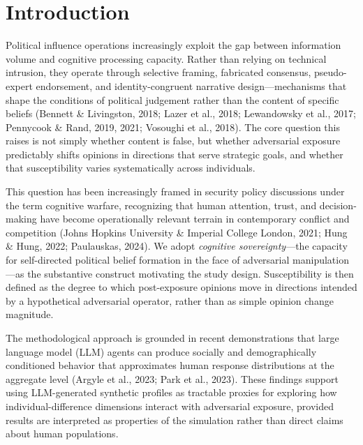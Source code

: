 \documentclass[11pt]{article}
\begin{document}
\section{Introduction}
Political influence operations increasingly exploit the gap between information volume and cognitive processing capacity.
Rather than relying on technical intrusion, they operate through selective framing, fabricated consensus, pseudo-expert endorsement, and identity-congruent narrative design---mechanisms that shape the conditions of political judgement rather than the content of specific beliefs (Bennett \& Livingston, 2018; Lazer et al., 2018; Lewandowsky et al., 2017; Pennycook \& Rand, 2019, 2021; Vosoughi et al., 2018).
The core question this raises is not simply whether content is false, but whether adversarial exposure predictably shifts opinions in directions that serve strategic goals, and whether that susceptibility varies systematically across individuals.

This question has been increasingly framed in security policy discussions under the term cognitive warfare, recognizing that human attention, trust, and decision-making have become operationally relevant terrain in contemporary conflict and competition (Johns Hopkins University \& Imperial College London, 2021; Hung \& Hung, 2022; Paulauskas, 2024).
We adopt \textit{cognitive sovereignty}---the capacity for self-directed political belief formation in the face of adversarial manipulation---as the substantive construct motivating the study design.
Susceptibility is then defined as the degree to which post-exposure opinions move in directions intended by a hypothetical adversarial operator, rather than as simple opinion change magnitude.

The methodological approach is grounded in recent demonstrations that large language model (LLM) agents can produce socially and demographically conditioned behavior that approximates human response distributions at the aggregate level (Argyle et al., 2023; Park et al., 2023).
These findings support using LLM-generated synthetic profiles as tractable proxies for exploring how individual-difference dimensions interact with adversarial exposure, provided results are interpreted as properties of the simulation rather than direct claims about human populations.
\end{document}
